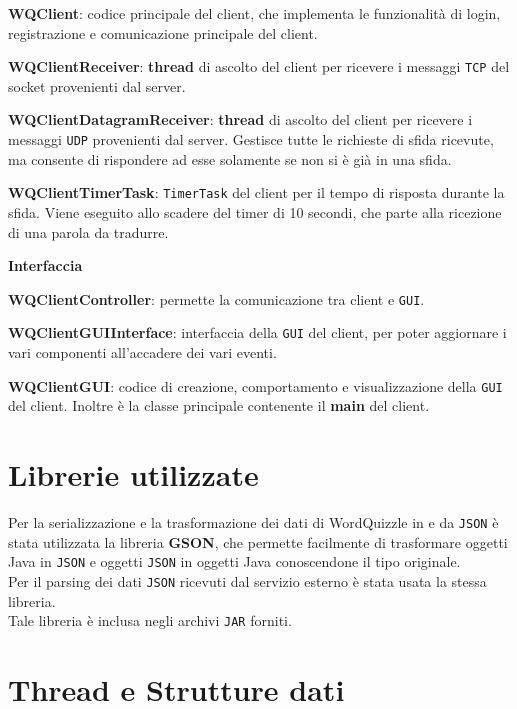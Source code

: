 \documentclass[10pt]{article}
\begin{document}
{\begin{list}{}{\textbf{Client}}
	\item \textbf{WQClient}: codice principale del client, che implementa le funzionalità di login, registrazione e comunicazione principale del client.
	\item \textbf{WQClientReceiver}: \textbf{thread} di ascolto del client per ricevere i messaggi \texttt{TCP} del socket provenienti dal server.
	\item \textbf{WQClientDatagramReceiver}: \textbf{thread} di ascolto del client per ricevere i messaggi \texttt{UDP} provenienti dal server. Gestisce tutte le richieste di sfida ricevute, ma consente di rispondere ad esse solamente se non si è già in una sfida.
	\item \textbf{WQClientTimerTask}: \texttt{TimerTask} del client per il tempo di risposta durante la sfida. Viene eseguito allo scadere del timer di 10 secondi, che parte alla ricezione di una parola da tradurre.
	\item \textbf{Interfaccia}
	\item \textbf{WQClientController}: permette la comunicazione tra client e \texttt{GUI}.
	\item \textbf{WQClientGUIInterface}: interfaccia della \texttt{GUI} del client, per poter aggiornare i vari componenti all'accadere dei vari eventi.
	\item \textbf{WQClientGUI}: codice di creazione, comportamento e visualizzazione della \texttt{GUI} del client. Inoltre è la classe principale contenente il \textbf{main} del client.
\end{list}
\section{Librerie utilizzate}
Per la serializzazione e la trasformazione dei dati di WordQuizzle in e da \texttt{JSON} è stata utilizzata la libreria \textbf{GSON}, che permette facilmente di trasformare oggetti Java in \texttt{JSON} e oggetti \texttt{JSON} in oggetti Java conoscendone il tipo originale.\\
Per il parsing dei dati \texttt{JSON} ricevuti dal servizio esterno è stata usata la stessa libreria.\\
Tale libreria è inclusa negli archivi \texttt{JAR} forniti.
\pagebreak
\section{Thread e Strutture dati}
}
\end{document}
